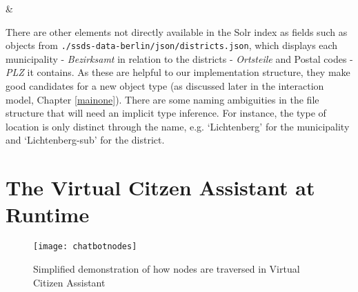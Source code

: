 \begin{table}[H]
\begin{tabu}
								 &  \\		

		
		
	\end{tabu}
\end{table}
















There are other elements not directly available in the Solr index as fields such as objects from \texttt{./ssds-data-berlin/json/districts.json}, which displays each municipality - \textit{Bezirksamt} in relation to the districts - \textit{Ortsteile} and Postal codes - \textit{PLZ} it contains.  As these are helpful to our implementation structure, they make good candidates for a new object type (as discussed later in the interaction model, Chapter \ref{mainone}).  There are some naming ambiguities in the file structure that will need an implicit type inference. For instance, the type of location is only distinct through the name, e.g. `Lichtenberg' for the municipality and `Lichtenberg-sub' for the district.






\section{The Virtual Citzen Assistant at Runtime}

\begin{wrapfigure}{l}{0.5\textwidth}
	\caption[Simplified Demonstration of Nodes' Traversal]{Simplified demonstration of how nodes are traversed in Virtual Citizen Assistant}
	\label{chatbotnodes}
	\texttt{[image: chatbotnodes]}
\end{wrapfigure}



